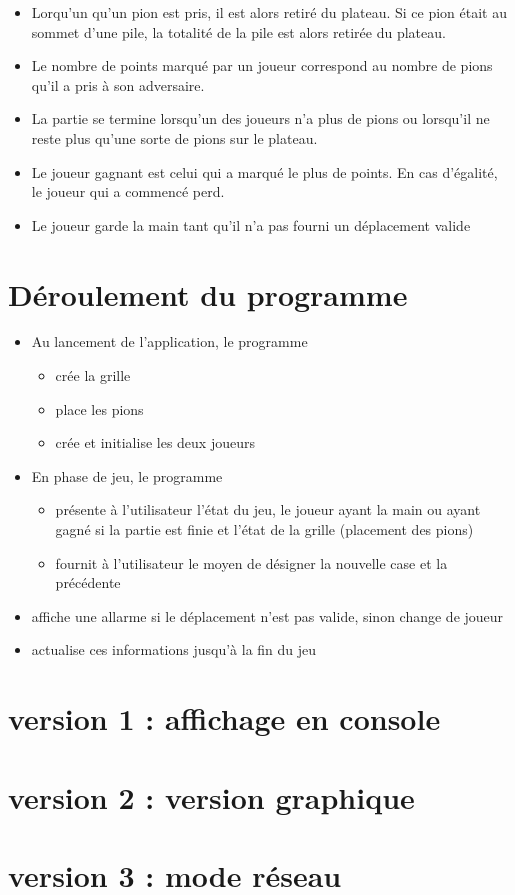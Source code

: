 \documentclass[12pt]{article}
\begin{document}
\begin{itemize}
\item Lorqu'un qu'un pion est pris, il est alors retiré du plateau. Si ce pion était au sommet d'une pile, la totalité de la pile est alors retirée du plateau. 
\item Le nombre de points marqué par un joueur correspond au nombre de pions qu'il a pris à son adversaire.
\item La partie se termine lorsqu'un des joueurs n'a plus de pions ou lorsqu'il ne reste plus qu'une sorte de pions sur le plateau.
\item Le joueur gagnant est celui qui a marqué le plus de points. En cas d'égalité, le joueur qui a commencé perd.
\item Le joueur garde la main tant qu'il n'a pas fourni un déplacement valide
\end{itemize}

\section{Déroulement du programme}
 \begin{itemize}
 \item Au lancement de l'application, le programme
 \begin{itemize}
  \item[\textbullet] crée la grille
  \item[\textbullet] place les pions
  \item[\textbullet] crée et initialise les deux joueurs
 \end{itemize}
 \item En phase de jeu, le programme
 \begin{itemize}
  \item[\textbullet] présente à l'utilisateur l'état du jeu, le joueur ayant la main ou ayant gagné si la partie est finie et l'état de la grille (placement des pions)
  \item[\textbullet] fournit à l'utilisateur le moyen de désigner la nouvelle case et la précédente
  \end{itemize}
 
  \item affiche une allarme si le déplacement n'est pas valide, sinon change de joueur
  \item actualise ces informations jusqu'à la fin du jeu
 \end{itemize}
\section{version 1 : affichage en console}

\section{version 2 : version graphique}

\section{version 3 : mode réseau}

 
\end{document}
